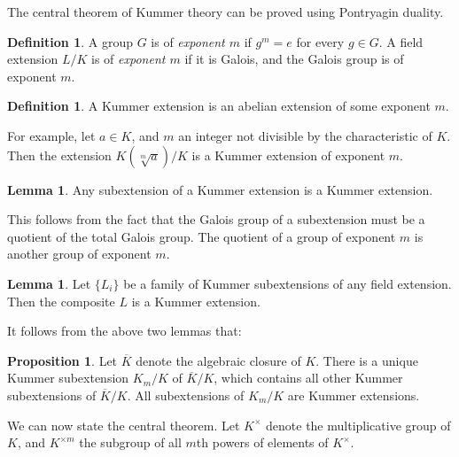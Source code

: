 \documentclass[12pt, a4paper]{article}
\theoremstyle{definition}
\newtheorem{prop}[theorem]{Proposition}
\newtheorem{lemma}[theorem]{Lemma}
\newtheorem{definition}[theorem]{Definition}
\begin{document}
The central theorem of Kummer theory can be proved using Pontryagin duality. \cite{streng}

\begin{definition}
A group $G$ is of \emph{exponent $m$} if $g^m = e$ for every $g \in G$. A field extension $L/K$ is of \emph{exponent $m$} if it is Galois, and the Galois group is of exponent $m$.
\end{definition}

\begin{definition}
A Kummer extension is an abelian extension of some exponent $m$.
\end{definition}

For example, let $a \in K$, and $m$ an integer not divisible by the characteristic of $K$. Then the extension $K(\sqrt[m]{a})/K$ is a Kummer extension of exponent $m$.

\begin{lemma}
Any subextension of a Kummer extension is a Kummer extension.
\end{lemma}

This follows from the fact that the Galois group of a subextension must be a quotient of the total Galois group. The quotient of a group of exponent $m$ is another group of exponent $m$.

\begin{lemma}
Let $\{ L_i \}$ be a family of Kummer subextensions of any field extension. Then the composite $L$ is a Kummer extension.
\end{lemma}

It follows from the above two lemmas that:

\begin{prop}
Let $\overline{K}$ denote the algebraic closure of $K$. There is a unique Kummer subextension $K_m/K$ of $\overline{K}/K$, which contains all other Kummer subextensions of $\overline{K}/K$. All subextensions of $K_m/K$ are Kummer extensions.
\end{prop}

We can now state the central theorem. Let $K^\times$ denote the multiplicative group of $K$, and $K^{\times m}$ the subgroup of all $m$th powers of elements of $K^\times$. %
\end{document}
